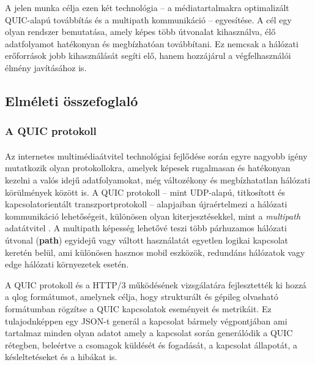 \documentclass[a4paper,oneside]{article}
\begin{document}
A jelen munka célja ezen két technológia – a médiatartalmakra optimalizált QUIC-alapú 
továbbítás és a multipath kommunikáció – egyesítése. A cél egy olyan rendszer bemutatása, 
amely képes több útvonalat kihasználva, élő adatfolyamot hatékonyan és megbízhatóan 
továbbítani. Ez nemcsak a hálózati erőforrások jobb kihasználását segíti elő, hanem 
hozzájárul a végfelhasználói élmény javításához is.



\subsection{Elméleti összefoglaló}

\subsubsection{A QUIC protokoll}
\paragraph{}
Az internetes multimédiaátvitel technológiai fejlődése során egyre 
nagyobb igény mutatkozik olyan protokollokra, amelyek képesek 
rugalmasan és hatékonyan kezelni a valós idejű adatfolyamokat, még 
változékony és megbízhatatlan hálózati körülmények között is. \cite{quic} A QUIC 
protokoll – mint UDP-alapú, titkosított és kapcsolatorientált 
transzportprotokoll – alapjaiban újraértelmezi a hálózati kommunikáció 
lehetőségeit, különösen olyan kiterjesztésekkel, mint a \emph{multipath} 
adatátvitel \cite{mp_quic}. A multipath képesség lehetővé teszi több párhuzamos hálózati 
útvonal (\textbf{path}) egyidejű vagy váltott használatát egyetlen logikai kapcsolat keretén 
belül, ami különösen hasznos mobil eszközök, redundáns hálózatok vagy edge 
hálózati környezetek esetén.

A QUIC protokoll és a HTTP/3 működésének vizsgálatára fejlesztették ki hozzá a qlog \cite{qlog} formátumot, amelynek célja,
hogy strukturált és gépileg olvasható formátumban rögzítse a QUIC kapcsolatok eseményeit és metrikáit.
Ez tulajodnképpen egy JSON-t generál a kapcsolat bármely végpontjában ami tartalmaz minden olyan adatot amely a 
kapcsolat során generálódik a QUIC rétegben, beleértve a csomagok küldését és fogadását,
a kapcsolat állapotát, a késleltetéseket és a hibákat is.
\end{document}

